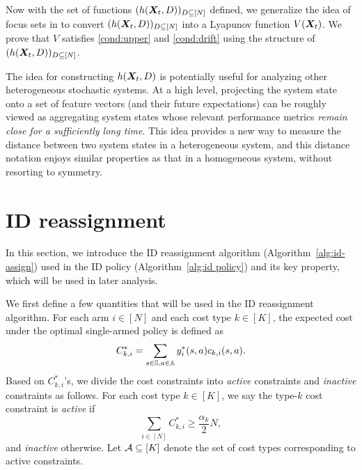 \documentclass[11pt,letterpaper]{article}
\begin{document}
Now with the set of functions $(h({\bm{X}}_t,D))_{D\subseteq [N]}$ defined, we generalize the idea of focus sets in \citep{HonXieChe_24} to convert $(h({\bm{X}}_t,D))_{D\subseteq [N]}$ into a Lyapunov function $V({\bm{X}}_t)$.
We prove that $V$ satisfies \ref{cond:upper} and \ref{cond:drift} using the structure of $(h({\bm{X}}_t,D))_{D\subseteq [N]}$.


\begin{remark}
The idea for constructing $h({\bm{X}}_t, D)$ is potentially useful for analyzing other heterogeneous stochastic systems. 
At a high level, projecting the system state onto a set of feature vectors (and their future expectations) can be roughly viewed as aggregating system states whose relevant performance metrics \emph{remain close for a sufficiently long time}. 
This idea provides a new way to measure the distance between two system states in a heterogeneous system, and this distance notation enjoys similar properties as that in a homogeneous system, without resorting to symmetry.  
\end{remark}






\section{ID reassignment}\label{sec:ID-reassignment}
In this section, we introduce the ID reassignment algorithm (Algorithm~\ref{alg:id-assign}) used in the ID policy (Algorithm~\ref{alg:id policy}) and its key property, which will be used in later analysis.

We first define a few quantities that will be used in the ID reassignment algorithm.
For each arm $i\in[N]$ and each cost type $k\in[K]$, the expected cost under the optimal single-armed policy is defined as
\begin{align}\label{eq:C_k,i}
    C_{k,i}^* =\sum_{s\in\mathbb{S},a\in\mathbb{A}}y_i^*(s,a)c_{k,i}(s,a).
\end{align}
Based on $C_{k,i}^*$'s, we divide the cost constraints into \emph{active} constraints and \emph{inactive} constraints as follows.
For each cost type $k\in[K]$, we say the type-$k$ cost constraint is \emph{active} if
\begin{equation}\label{eq:active}
    \sum_{i\in[N]}C_{k,i}^*\ge \frac{\alpha_k}{2}N,
\end{equation}
and \emph{inactive} otherwise.
Let $\mathcal{A}\subseteq [K]$ denote the set of cost types corresponding to active constraints.
\end{document}
